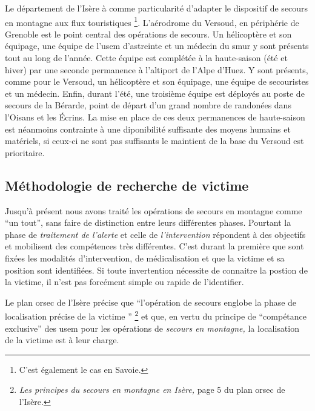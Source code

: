 Le département de l'Isère à comme particularité d'adapter le
dispositif de secours en montagne aux flux touristiques
\footnote{C'est également le cas en Savoie.}. L'aérodrome du Versoud,
en périphérie de Grenoble est le point central des opérations de
secours. Un hélicoptère et son équipage, une équipe de l'\ac{usem}
d'astreinte et un médecin du \ac{smur} y sont présents tout au long de
l'année. Cette équipe est complétée à la haute-saison (été et hiver)
par une seconde permanence à l'altiport de l'Alpe d'Huez. Y sont
présents, comme pour le Versoud, un hélicoptère et son équipage, une
équipe de secouristes et un médecin. Enfin, durant l'été, une
troisième équipe est déployés au poste de secours de la Bérarde, point
de départ d'un grand nombre de randonées dans l'Oisans et les
Écrins. La mise en place de ces deux permanences de haute-saison est
néanmoins contrainte à une diponibilité suffisante des moyens humains
et matériels, si ceux-ci ne sont pas suffisants le maintient de la
base du Versoud est prioritaire.

\subsection{Méthodologie de recherche de victime}
\label{susec:1-1-2}

Jusqu'à présent nous avons traité les opérations de secours en
montagne comme \enquote{un tout}, sans faire de distinction entre
leurs différentes phases.
%
Pourtant la phase de \emph{traitement de l'alerte} et celle de
\emph{l'intervention} répondent à des objectifs et mobilisent des
compétences très différentes. C'est durant la première que sont fixées
les modalités d'intervention, de médicalisation et que la victime et
sa position sont identifiées. Si toute invertention nécessite de
connaitre la postion de la victime, il n'est pas forcément simple ou
rapide de l'identifier.


Le plan \ac{orsec} de l'Isère précise que \enquote{l’opération de
  secours \textelp{} englobe la phase de localisation précise de la
  victime \textelp{}} \footnote{\emph{Les principes du secours en
    montagne en Isère,} page 5 du plan \ac{orsec} de l'Isère.} et que,
en vertu du principe de \enquote{compétance exclusive} des \ac{usem}
pour les opérations de \emph{secours en montagne,} la localisation de
la victime est à leur charge.


